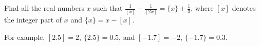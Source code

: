 \documentclass[varwidth]{standalone}
\begin{document}
    Find all the real numbers $x$ such that $\frac{1}{[x]} + \frac{1}{[2x]} = \{ x \} + \frac{1}{3}$, where $[x]$ denotes the integer part of $x$ and $\{ x \} = x - [x]$.

    For example, $[2.5] = 2$, $\{ 2.5 \} = 0.5$, and $[-1.7] = -2$, $\{ -1.7 \} = 0.3$.
\end{document}
